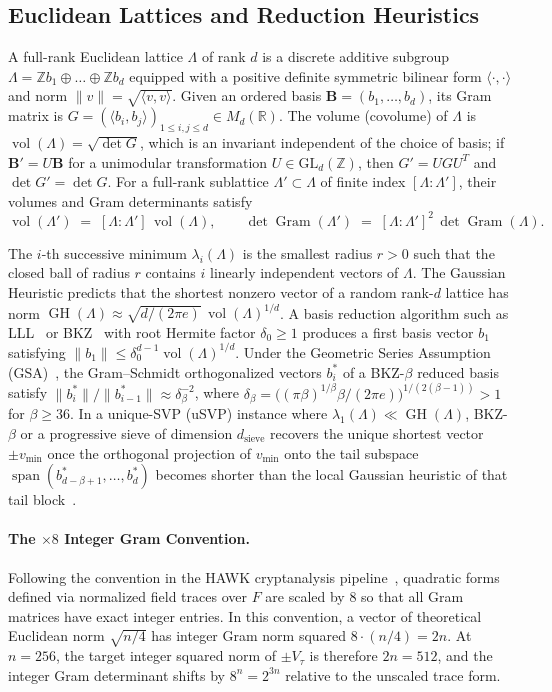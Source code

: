\documentclass[11pt,a4paper]{article}
\theoremstyle{definition}
\newcommand{\Z}{\mathbb{Z}}
\newcommand{\R}{\mathbb{R}}
\newcommand{\Vt}{V_\tau}
\newcommand{\vol}{\operatorname{vol}}
\newcommand{\Gram}{\operatorname{Gram}}
\begin{document}
\subsection{Euclidean Lattices and Reduction Heuristics}
A full-rank Euclidean lattice $\Lambda$ of rank $d$ is a discrete additive subgroup $\Lambda = \Z b_1 \oplus \dots \oplus \Z b_d$ equipped with a positive definite symmetric bilinear form $\langle \cdot, \cdot \rangle$ and norm $\|v\| = \sqrt{\langle v, v \rangle}$. Given an ordered basis $\mathbf{B} = (b_1, \dots, b_d)$, its Gram matrix is $G = (\langle b_i, b_j \rangle)_{1 \le i,j \le d} \in M_d(\R)$. The volume (covolume) of $\Lambda$ is $\vol(\Lambda) = \sqrt{\det G}$, which is an invariant independent of the choice of basis; if $\mathbf{B}' = U \mathbf{B}$ for a unimodular transformation $U \in \mathrm{GL}_d(\Z)$, then $G' = U G U^T$ and $\det G' = \det G$. For a full-rank sublattice $\Lambda' \subset \Lambda$ of finite index $[\Lambda : \Lambda']$, their volumes and Gram determinants satisfy
\[
  \vol(\Lambda') \;=\; [\Lambda : \Lambda']\,\vol(\Lambda),
  \qquad
  \det \Gram(\Lambda') \;=\; [\Lambda : \Lambda']^2\,\det \Gram(\Lambda).
\]

The $i$-th successive minimum $\lambda_i(\Lambda)$ is the smallest radius $r > 0$ such that the closed ball of radius $r$ contains $i$ linearly independent vectors of $\Lambda$. The Gaussian Heuristic predicts that the shortest nonzero vector of a random rank-$d$ lattice has norm $\operatorname{GH}(\Lambda) \approx \sqrt{d/(2\pi e)}\,\vol(\Lambda)^{1/d}$. A basis reduction algorithm such as LLL~\cite{LLL82} or BKZ~\cite{Schnorr87,CN11} with root Hermite factor $\delta_0 \ge 1$ produces a first basis vector $b_1$ satisfying $\|b_1\| \le \delta_0^{d-1}\vol(\Lambda)^{1/d}$. Under the Geometric Series Assumption (GSA)~\cite{CN11,AD21}, the Gram--Schmidt orthogonalized vectors $b_i^*$ of a BKZ-$\beta$ reduced basis satisfy $\|b_i^*\| / \|b_{i-1}^*\| \approx \delta_\beta^{-2}$, where $\delta_\beta = \bigl((\pi\beta)^{1/\beta}\beta/(2\pi e)\bigr)^{1/(2(\beta-1))} > 1$ for $\beta \ge 36$. In a unique-SVP (uSVP) instance where $\lambda_1(\Lambda) \ll \operatorname{GH}(\Lambda)$, BKZ-$\beta$ or a progressive sieve of dimension $d_{\mathrm{sieve}}$ recovers the unique shortest vector $\pm v_{\min}$ once the orthogonal projection of $v_{\min}$ onto the tail subspace $\operatorname{span}(b_{d-\beta+1}^*, \dots, b_d^*)$ becomes shorter than the local Gaussian heuristic of that tail block~\cite{AD21}.

\paragraph{The $\times 8$ Integer Gram Convention.}
Following the convention in the HAWK cryptanalysis pipeline~\cite{SW26}, quadratic forms defined via normalized field traces over $F$ are scaled by $8$ so that all Gram matrices have exact integer entries. In this convention, a vector of theoretical Euclidean norm $\sqrt{n/4}$ has integer Gram norm squared $8 \cdot (n/4) = 2n$. At $n=256$, the target integer squared norm of $\pm \Vt$ is therefore $2n = 512$, and the integer Gram determinant shifts by $8^n = 2^{3n}$ relative to the unscaled trace form.
\end{document}
